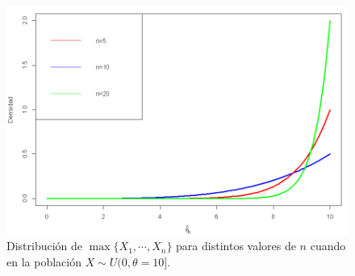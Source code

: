 \documentclass{beamer}
\theoremstyle{definition}
\newcommand{\ton}{\underset{n\to\infty}{\longrightarrow}}
\begin{document}
\begin{frame}

\begin{figure}
    \centering
    \includegraphics[scale=0.45]{img/consist.png}
    \caption{Distribución de  $\max \{X_1, \cdots, X_n\}$ para distintos valores de $n$ cuando en la población $X\sim U(0,\theta = 10]$.}
\end{figure}

    
\end{frame}


%     
\end{document}
